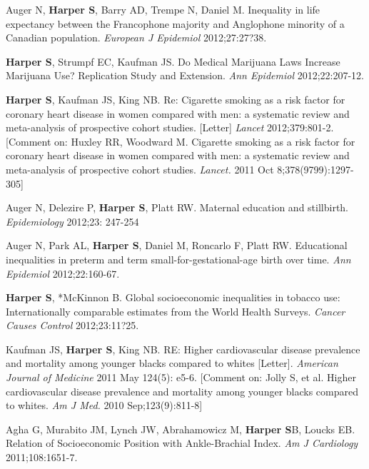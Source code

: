 \documentclass[
  letterpaper,
  DIV=11,
  numbers=noendperiod]{scrartcl}
\begin{document}
\begin{etaremune}
\item Auger N, \textbf{Harper S}, Barry AD, Trempe N, Daniel M. Inequality in life expectancy between the Francophone majority and Anglophone minority of a Canadian population. \emph{European J Epidemiol} 2012;27:27?38.
 
\item \textbf{Harper S}, Strumpf EC, Kaufman JS. Do Medical Marijuana Laws Increase Marijuana Use? Replication Study and Extension. \emph{Ann Epidemiol} 2012;22:207-12.
 
\item \textbf{Harper S}, Kaufman JS, King NB. Re: Cigarette smoking as a risk factor for coronary heart disease in women compared with men: a systematic review and meta-analysis of prospective cohort studies. [Letter] \emph{Lancet} 2012;379:801-2. [Comment on:  Huxley RR, Woodward M. Cigarette smoking as a risk factor for coronary heart disease in women compared with men: a systematic review and meta-analysis of prospective cohort studies. \emph{Lancet.} 2011 Oct 8;378(9799):1297-305]
 
\item Auger N, Delezire P, \textbf{Harper S}, Platt RW. Maternal education and stillbirth. \emph{Epidemiology} 2012;23: 247-254
 
\item Auger N, Park AL, \textbf{Harper S}, Daniel M, Roncarlo F, Platt RW. Educational inequalities in preterm and term small-for-gestational-age birth over time. \emph{Ann Epidemiol} 2012;22:160-67. 
 
\item \textbf{Harper S}, *McKinnon B. Global socioeconomic inequalities in tobacco use: Internationally comparable estimates from the World Health Surveys. \emph{Cancer Causes Control} 2012;23:11?25.

\item Kaufman JS, \textbf{Harper S}, King NB. RE: Higher cardiovascular disease prevalence and mortality among younger blacks compared to whites [Letter]. \emph{American Journal of Medicine} 2011 May 124(5): e5-6.  [Comment on: Jolly S, et al. Higher cardiovascular disease prevalence and mortality among younger blacks compared to whites. \emph{Am J Med.} 2010 Sep;123(9):811-8]
 
\item Agha G, Murabito JM, Lynch JW, Abrahamowicz M, \textbf{Harper S}B, Loucks EB. Relation of Socioeconomic Position with Ankle-Brachial Index. \emph{Am J Cardiology} 2011;108:1651-7.
 

\end{etaremune}
\end{document}
